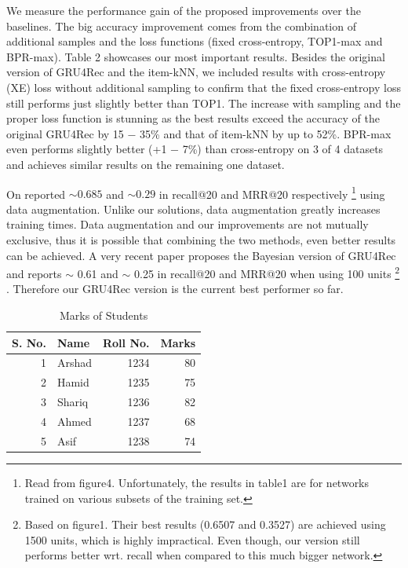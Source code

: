 \documentclass{article} %
\begin{document}
We measure the performance gain of the proposed improvements over the baselines. The big accuracy improvement comes from the combination of additional samples and the loss functions (fixed cross-entropy, TOP1-max and BPR-max). Table 2 showcases our most important results. Besides the original version of GRU4Rec and the item-kNN, we included results with cross-entropy (XE) loss without additional sampling to confirm that the fixed cross-entropy loss still performs just slightly better than TOP1. The increase with sampling and the proper loss function is stunning as the best results exceed the accuracy of the original GRU4Rec by 15 − 35\% and that of item-kNN by up to 52\%. BPR-max even performs slightly better (+1 − 7\%) than cross-entropy on 3 of 4 datasets and achieves similar results on the remaining one dataset.

On \cite{tan2016improved} reported $∼ 0.685$ and $∼ 0.29$ in recall@20 and MRR@20 respectively \footnote[11]{Read from figure4. Unfortunately, the results in table1 are for networks trained on various subsets of the
training set.} using data augmentation. Unlike our solutions, data augmentation greatly increases training
times. Data augmentation and our improvements are not mutually exclusive, thus it is possible that
combining the two methods, even better results can be achieved. A very recent paper \cite{chatzis2017recurrent} proposes the Bayesian version of GRU4Rec and reports $\sim $ 0.61 and $\sim $ 0.25 in recall@20 and MRR@20 when using 100 units \footnote[12]{Based on figure1. Their best results (0.6507 and 0.3527) are achieved using 1500 units, which is highly impractical. Even though, our version still performs better wrt. recall when compared to this much bigger network.} . Therefore our GRU4Rec version is the current best performer so far.


\begin{table}[htbp]
\label{table:table3}
  \centering
  \caption{Marks of Students}
    \begin{tabular}{|r|l|r|r|}
		\hline
    S. No. &Name& Roll No. &Marks \\
		\hline
    1     & Arshad & 1234  & 80 \\
    2     & Hamid & 1235  & 75 \\
    3     & Shariq & 1236  & 82 \\
    4     & Ahmed & 1237  & 68 \\
    5     & Asif  & 1238  & 74 \\
		\hline
		\hline
    \end{tabular}%
  \label{tab:addlabel}%
\end{table}%
\end{document}
